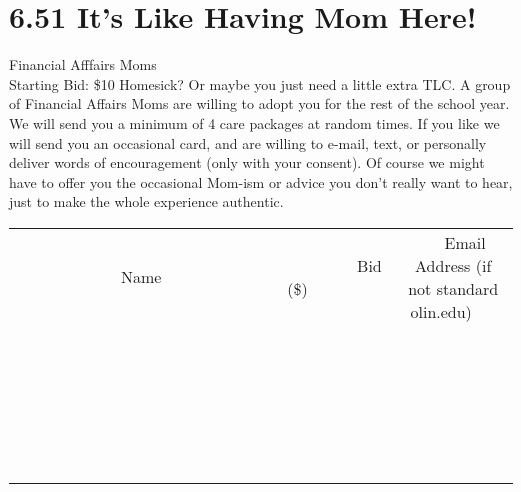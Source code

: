 \documentclass[11pt]{article}
\begin{document}
\section*{6.51 It's Like Having Mom Here!}
Financial Afffairs Moms
\\
Starting Bid: \$10
\newline
Homesick?  Or maybe you just need a little extra TLC.  A group of Financial Affairs Moms are willing to adopt you for the rest of the school year.  We will send you a minimum of 4 care packages at random times.  If you like we will send you an occasional card, and are willing to e-mail, text, or personally deliver words of encouragement (only with your consent).  Of course we might have to offer you the occasional Mom-ism or advice you don’t really want to hear, just to make the whole experience authentic.
\\[6ex]
\begin{tabular}{c c c}
~~~~~~~~~~~~~Name~~~~~~~~~~~~~ & ~~~~~~~~~Bid (\$)~~~~~~~~~  & ~~~Email Address (if not standard olin.edu)~~~\\
 & & \\
\hline
 & & \\
\hline
 & & \\
\hline
 & & \\
\hline
 & & \\
\hline
 & & \\
\hline
 & & \\
\hline
 & & \\
\hline
 & & \\
\hline
 & & \\
\hline
 & & \\
\hline
 & & \\
\hline
 & & \\
\hline
 & & \\
\hline
 & & \\
\hline
 & & \\
\hline
 & & \\
\hline
 & & \\
\hline
 & & \\
\hline
 & & \\
\hline
 & & \\
\hline
 & & \\
\hline
 & & \\
\hline
 & & \\
\hline
 & & \\
\hline
 & & \\
\hline
\end{tabular}
\newpage
\end{document}
